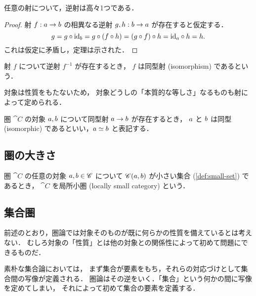 \documentclass[titlepage]{ltjsreport}
\begin{document}
\begin{theorem}[逆射の一意性]
  任意の射について，逆射は高々1つである．
\end{theorem}

\begin{proof}
  \def\a{\obj{a}}%
  \def\b{\obj{b}}%
  射 $\mrp{f}{\a}{\b}$ の相異なる逆射 $\mrp{g,h}{\b}{\a}$ が存在すると仮定する．
  \begin{equation*}
    g=g\circ\id{\b}=g\circ(f\circ h)=(g\circ f)\circ h=\id{\a}\circ h=h.
  \end{equation*}
  これは仮定に矛盾し，定理は示された．
\end{proof}

\begin{definition}[同型射]
  射 $f$ について逆射 $f^{-1}$ が存在するとき，
  $f$ は同型射 (isomorphism) であるという．
\end{definition}

対象は性質をもたないため，
対象どうしの「本質的な等しさ」なるものも射によって定められる．

\begin{definition}[同型]
  \def\a{\obj{a}}%
  \def\b{\obj{b}}%
  圏 $\cat{C}$ の対象 $\a,\b$ について同型射 $\a\to\b$ が存在するとき，
  $\a$ と $\b$ は同型 (isomorphic) であるといい，$\a\simeq\b$ と表記する．
\end{definition}

\subsection{圏の大きさ}

\begin{definition}[局所小圏]
  \def\C{\cat{C}}%
  \def\a{\obj{a}}%
  \def\b{\obj{b}}%
  圏 $\C$ の任意の対象 $\a,\b\in\C$ について
  $\mrps{\C}{\a}{\b}$ が小さい集合 (\cref{def:small-set}) であるとき，
  $\C$ を局所小圏 (locally small category) という．
\end{definition}

\subsection{集合圏}

前述のとおり，圏論では対象そのものが既に何らかの性質を備えているとは考えない．
むしろ対象の「性質」とは他の対象との関係性によって初めて問題にできるものだ．

素朴な集合論においては，
まず集合が要素をもち，それらの対応づけとして集合間の写像が定義される．
圏論はその逆をいく．「集合」という何かの間に写像を定めてしまい，
それによって初めて集合の要素を定義する．
\end{document}
